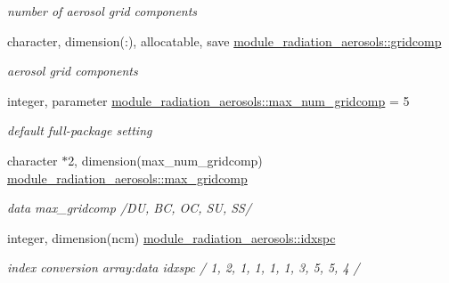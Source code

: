 \begin{DoxyCompactItemize}
\begin{DoxyCompactList}\small\item\em number of aerosol grid components \end{DoxyCompactList}\item 
\mbox{\label{group__module__radiation__aerosols_ga48c2c6c9c509f5c37fea5d788040ad7a}} 
character, dimension(\+:), allocatable, save \hyperlink{group__module__radiation__aerosols_ga48c2c6c9c509f5c37fea5d788040ad7a}{module\+\_\+radiation\+\_\+aerosols\+::gridcomp}
\begin{DoxyCompactList}\small\item\em aerosol grid components \end{DoxyCompactList}\item 
\mbox{\label{group__module__radiation__aerosols_gad1187b5d87889c68cbe5929e20e83ac7}} 
integer, parameter \hyperlink{group__module__radiation__aerosols_gad1187b5d87889c68cbe5929e20e83ac7}{module\+\_\+radiation\+\_\+aerosols\+::max\+\_\+num\+\_\+gridcomp} = 5
\begin{DoxyCompactList}\small\item\em default full-\/package setting \end{DoxyCompactList}\item 
\mbox{\label{group__module__radiation__aerosols_gac8278b0db773d6ba6ab4d71c9bb1b109}} 
character $\ast$2, dimension(max\+\_\+num\+\_\+gridcomp) \hyperlink{group__module__radiation__aerosols_gac8278b0db773d6ba6ab4d71c9bb1b109}{module\+\_\+radiation\+\_\+aerosols\+::max\+\_\+gridcomp}
\begin{DoxyCompactList}\small\item\em data max\+\_\+gridcomp /\textquotesingle{}DU\textquotesingle{}, \textquotesingle{}BC\textquotesingle{}, \textquotesingle{}OC\textquotesingle{}, \textquotesingle{}SU\textquotesingle{}, \textquotesingle{}SS\textquotesingle{}/ \end{DoxyCompactList}\item 
\mbox{\label{group__module__radiation__aerosols_ga8ca79ca1e5161374aff3cad4121b360f}} 
integer, dimension(ncm) \hyperlink{group__module__radiation__aerosols_ga8ca79ca1e5161374aff3cad4121b360f}{module\+\_\+radiation\+\_\+aerosols\+::idxspc}
\begin{DoxyCompactList}\small\item\em index conversion array\+:data idxspc / 1, 2, 1, 1, 1, 1, 3, 5, 5, 4 / \end{DoxyCompactList}\item 

\end{DoxyCompactItemize}
